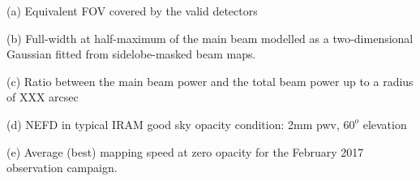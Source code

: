 \begin{table}[h]
\begin{threeparttable}
\begin{tabular}{|r|c|c|c|c|}
\end{tabular}
  \begin{tablenotes}
    
  \item[(a)] Equivalent FOV covered by the valid detectors
  \item[(b)] Full-width at half-maximum of the main beam modelled as a two-dimensional Gaussian fitted from sidelobe-masked beam maps.
  \item[(c)]  Ratio between the main beam power and the total beam power up to a radius of XXX arcsec
  \item[(d)] NEFD in typical IRAM good sky opacity condition: 2mm pwv, $60^o$ elevation
  \item[(e)] Average (best) mapping speed at zero opacity for the February 2017 observation campaign. 

  \end{tablenotes}
\end{threeparttable}
\end{table} 
